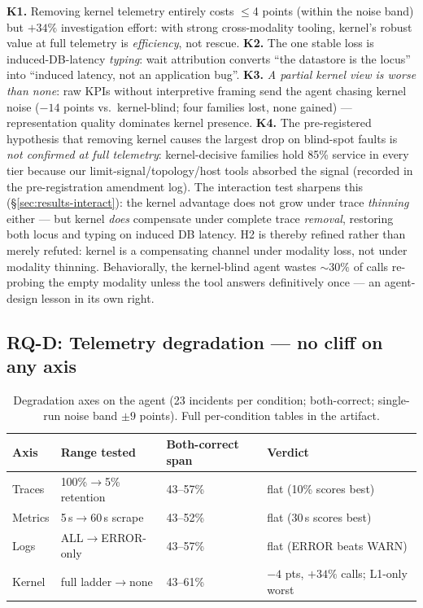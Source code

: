 \textbf{K1.} Removing kernel telemetry entirely costs $\le$4 points (within the noise
band) but $+34\%$ investigation effort: with strong cross-modality tooling, kernel's
robust value at full telemetry is \emph{efficiency}, not rescue. \textbf{K2.} The one
stable loss is induced-DB-latency \emph{typing}: wait attribution converts ``the
datastore is the locus'' into ``induced latency, not an application bug''.
\textbf{K3.} \emph{A partial kernel view is worse than none}: raw KPIs without
interpretive framing send the agent chasing kernel noise ($-14$ points vs.\
kernel-blind; four families lost, none gained) --- representation quality dominates
kernel presence. \textbf{K4.} The pre-registered hypothesis that removing kernel
causes the largest drop on blind-spot faults is \emph{not confirmed at full
telemetry}: kernel-decisive families hold 85\% service in every tier because our
limit-signal/topology/host tools absorbed the signal (recorded in the
pre-registration amendment log). The interaction test sharpens this
(\S\ref{sec:results-interact}): the kernel advantage does not grow under trace
\emph{thinning} either --- but kernel \emph{does} compensate under complete trace
\emph{removal}, restoring both locus and typing on induced DB latency. H2 is thereby
refined rather than merely refuted: kernel is a compensating channel under modality
loss, not under modality thinning. Behaviorally, the kernel-blind agent wastes
${\sim}30\%$ of calls re-probing the empty modality unless the tool answers
definitively once --- an agent-design lesson in its own right.

\subsection{RQ-D: Telemetry degradation --- no cliff on any axis}
\label{sec:results-trace}

\begin{table}[t]
\caption{Degradation axes on the agent (23 incidents per condition; both-correct;
single-run noise band ${\pm}9$ points). Full per-condition tables in the artifact.}
\label{tab:degradation}
\begin{tabular}{llll}
\toprule
Axis & Range tested & Both-correct span & Verdict \\
\midrule
Traces & 100\%$\to$5\% retention & 43--57\% & flat (10\% scores best) \\
Metrics & 5\,s$\to$60\,s scrape & 43--52\% & flat (30\,s scores best) \\
Logs & ALL$\to$ERROR-only & 43--57\% & flat (ERROR beats WARN) \\
Kernel & full ladder$\to$none & 43--61\% & $-4$ pts, $+34\%$ calls; L1-only worst \\
\bottomrule
\end{tabular}
\end{table}


